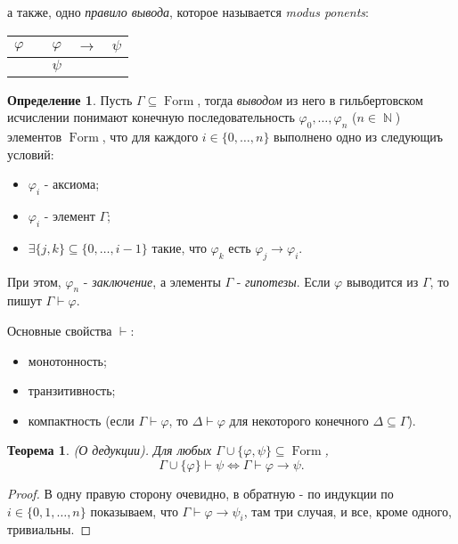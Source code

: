 \documentclass[a4paper,100pt]{article}
\theoremstyle{indented}
\newtheorem{theorem}{Теорема}
\theoremstyle{definition}
\newtheorem{defn}{Определение}
\theoremstyle{remark}
\DeclareMathOperator{\NN}{\mathbb{N}}
\DeclareMathOperator{\form}{Form}
\begin{document}
а также, одно \textit{правило вывода}, которое называется \textit{modus ponents}:

\begin{center}
  \begin{tabular}{c c c c c}
    $\varphi$ & & $\varphi$ & $\rightarrow$ & $\psi$ \\ 
    \hline
    & & $\psi$ & & 
  \end{tabular}
\end{center}

\begin{defn}
  Пусть $\Gamma \subseteq \form$, тогда \textit{выводом} из него в гильбертовском исчислении понимают конечную последовательность $\varphi_0, \ldots, \varphi_n$ ($n\in \NN$) элементов $\form$, что для каждого $i\in\{0, \ldots, n\}$ выполнено одно из следующиъ условий: 

  \begin{itemize}
    \item $\varphi_i$ - аксиома; 
    \item $\varphi_i$ - элемент $\Gamma$; 
    \item $\exists \{j, k\}\subseteq\{0, \ldots, i-1\}$ такие, что $\varphi_k$ есть $\varphi_j\rightarrow \varphi_i$. 
  \end{itemize}
  При этом, $\varphi_n$ - \textit{заключение}, а элементы $\Gamma$ - \textit{гипотезы}. Если $\varphi$ выводится из $\Gamma$, то пишут $\Gamma \vdash \varphi$. 
\end{defn}

Основные свойства $\vdash$:

\begin{itemize}
  \item монотонность; 
  \item транзитивность;
  \item компактность (если $\Gamma \vdash \varphi$, то $\Delta \vdash \varphi$ для некоторого конечного $\Delta \subseteq \Gamma$).
\end{itemize}

\begin{theorem}
  (О дедукции). Для любых $\Gamma \cup \{\varphi, \psi\}\subseteq \form$, 
  \[
    \Gamma \cup \{\varphi\}\vdash \psi \Longleftrightarrow \Gamma \vdash \varphi \rightarrow \psi. 
  \]
\end{theorem}

\begin{proof}
  В одну правую сторону очевидно, в обратную - по индукции по $i\in\{0, 1, \ldots, n\}$ показываем, что $\Gamma\vdash \varphi\rightarrow \psi_i$, там три случая, и все, кроме одного, тривиальны.
\end{proof}
\end{document}
